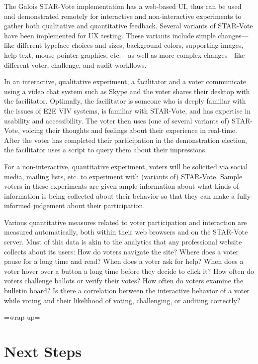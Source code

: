 The Galois STAR-Vote implementation has a web-based UI, thus can be
used and demonstrated remotely for interactive and non-interactive
experiments to gather both qualitative and quantitative feedback.
Several variants of STAR-Vote have been implemented for UX testing.
These variants include simple changes---like different typeface
choices and sizes, background colors, supporting images, help text,
mouse pointer graphics, etc.---as well as more complex changes---like
different voter, challenge, and audit workflows.

In an interactive, qualitative experiment, a facilitator and a voter
communicate using a video chat system such as Skype and the voter
shares their desktop with the facilitator.  Optimally, the facilitator
is someone who is deeply familiar with the issues of E2E VIV systems,
is familiar with STAR-Vote, and has expertise in usability and
accessibility.  The voter then uses (one of several variants of)
STAR-Vote, voicing their thoughts and feelings about their experience
in real-time.  After the voter has completed their participation in
the demonstration election, the facilitator uses a script to query
them about their impressions.

For a non-interactive, quantitative experiment, voters will be
solicited via social media, mailing lists, etc. to experiment with
(variants of) STAR-Vote.  Sample voters in these experiments are given
ample information about what kinds of information is being collected
about their behavior so that they can make a fully-informed judgement
about their participation.

Various quantitative measures related to voter participation and
interaction are measured automatically, both within their web browsers
and on the STAR-Vote server.  Must of this data is akin to the
analytics that any professional website collects about its users: How
do voters navigate the site?  Where does a voter pause for a long time
and read?  When does a voter ask for help?  When does a voter hover
over a button a long time before they decide to click it?  How often
do voters challenge ballots or verify their votes?  How often do
voters examine the bulletin board?  Is there a correlation between the
interactive behavior of a voter while voting and their likelihood of
voting, challenging, or auditing correctly?

=wrap up=



\section{Next Steps}
\label{sec:next-steps}


